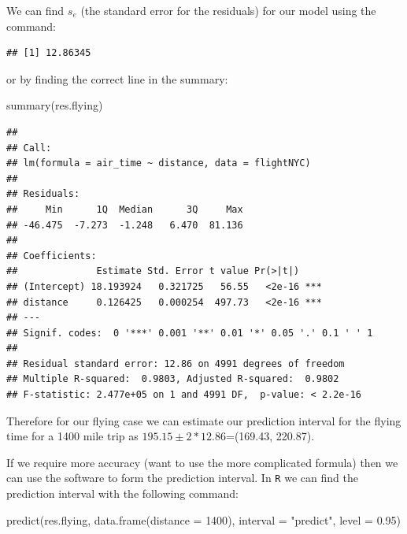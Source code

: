 \documentclass[
]{book}
\newenvironment{Shaded}{\begin{snugshade}}{\end{snugshade}}
\newcommand{\AttributeTok}[1]{\textcolor[rgb]{0.77,0.63,0.00}{#1}}
\newcommand{\DecValTok}[1]{\textcolor[rgb]{0.00,0.00,0.81}{#1}}
\newcommand{\FloatTok}[1]{\textcolor[rgb]{0.00,0.00,0.81}{#1}}
\newcommand{\FunctionTok}[1]{\textcolor[rgb]{0.00,0.00,0.00}{#1}}
\newcommand{\NormalTok}[1]{#1}
\newcommand{\SpecialCharTok}[1]{\textcolor[rgb]{0.00,0.00,0.00}{#1}}
\newcommand{\StringTok}[1]{\textcolor[rgb]{0.31,0.60,0.02}{#1}}
\theoremstyle{definition}
\theoremstyle{definition}
\theoremstyle{definition}
\theoremstyle{definition}
\theoremstyle{remark}
\begin{document}
We can find \(s_e\) (the standard error for the residuals) for our model using the command:

\begin{Shaded}
\end{Shaded}

\begin{verbatim}
## [1] 12.86345
\end{verbatim}

or by finding the correct line in the summary:

\begin{Shaded}
\begin{Highlighting}[]
\FunctionTok{summary}\NormalTok{(res.flying)}
\end{Highlighting}
\end{Shaded}

\begin{verbatim}
## 
## Call:
## lm(formula = air_time ~ distance, data = flightNYC)
## 
## Residuals:
##     Min      1Q  Median      3Q     Max 
## -46.475  -7.273  -1.248   6.470  81.136 
## 
## Coefficients:
##              Estimate Std. Error t value Pr(>|t|)    
## (Intercept) 18.193924   0.321725   56.55   <2e-16 ***
## distance     0.126425   0.000254  497.73   <2e-16 ***
## ---
## Signif. codes:  0 '***' 0.001 '**' 0.01 '*' 0.05 '.' 0.1 ' ' 1
## 
## Residual standard error: 12.86 on 4991 degrees of freedom
## Multiple R-squared:  0.9803, Adjusted R-squared:  0.9802 
## F-statistic: 2.477e+05 on 1 and 4991 DF,  p-value: < 2.2e-16
\end{verbatim}

Therefore for our flying case we can estimate our prediction interval for the flying time for a 1400 mile trip as \(195.15 \pm 2*12.86\)=(169.43, 220.87).

If we require more accuracy (want to use the more complicated formula) then we can use the software to form the prediction interval. In \texttt{R} we can find the prediction interval with the following command:

\begin{Shaded}
\begin{Highlighting}[]
\FunctionTok{predict}\NormalTok{(res.flying, }\FunctionTok{data.frame}\NormalTok{(}\AttributeTok{distance =} \DecValTok{1400}\NormalTok{), }\AttributeTok{interval =} \StringTok{"predict"}\NormalTok{, }\AttributeTok{level =} \FloatTok{0.95}\NormalTok{)}
\end{Highlighting}
\end{Shaded}
\end{document}
